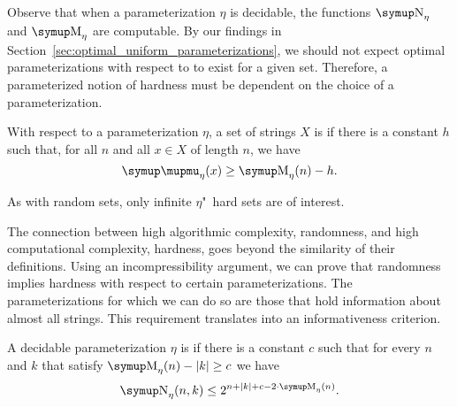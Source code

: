 Observe that when a parameterization $\eta$ is decidable, the functions $\upN_\eta$ and $\upM_\eta$ are computable.
By our findings in Section~\ref{sec:optimal_uniform_parameterizations}, we should not expect optimal parameterizations with respect to  to exist for a given set.
Therefore, a parameterized notion of hardness must be dependent on the choice of a parameterization.
\begin{definition}
  With respect to a parameterization $\eta$, a set of strings $X$ is  if there is a constant $h$ such that, for all $n$ and all $x \in X$ of length $n$, we have
  \begin{equation*}
    \mu_\eta(x) \ge \upM_\eta(n) - h.
  \end{equation*}
\end{definition}
As with random sets, only infinite $\eta$"~hard sets are of interest.

The connection between high algorithmic complexity, randomness, and high computational complexity, hardness, goes beyond the similarity of their definitions.
Using an incompressibility argument, we can prove that randomness implies hardness with respect to certain parameterizations.
The parameterizations for which we can do so are those that hold information about almost all strings.
This requirement translates into an informativeness criterion.
\begin{definition}
\label{def:informative}%
  A decidable parameterization $\eta$ is  if there is a constant $c$ such that for every $n$ and $k$ that satisfy $\upM_\eta(n) - \length{k} \ge c$ we have
  \begin{equation*}
    \upN_\eta(n, k) \le 2^{n + \length{k} + c - 2 \cdot \upM_\eta(n)}.
  \end{equation*}
\end{definition}

